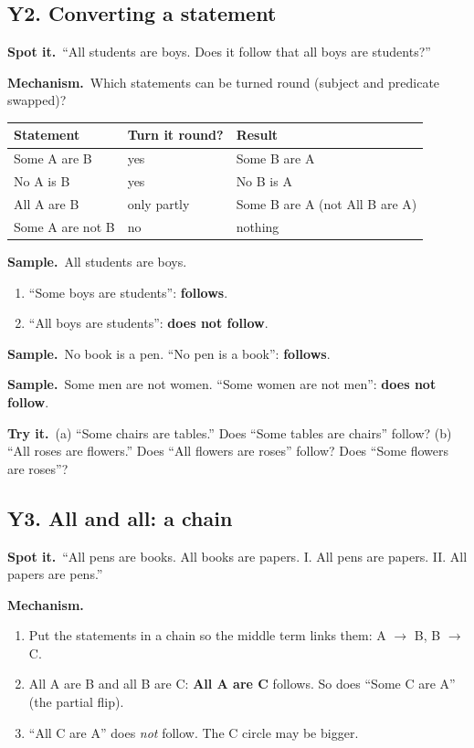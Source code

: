 \documentclass[11pt,a4paper]{article}
\let\oldsubsection\subsection
\renewcommand{\subsection}{\needspace{9\baselineskip}\oldsubsection}
\newcommand{\spot}{\textbf{\color{ember}Spot it.}\ }
\newcommand{\mech}{\textbf{\color{ember}Mechanism.}\ }
\newif\ifkeepsamp
\newcommand{\samp}{\ifkeepsamp\needspace{4\baselineskip}\fi\textbf{\color{ember}Sample.}\ }
\newcommand{\tryit}[1]{\textbf{\color{ember}Try it.}\ #1}
\begin{document}
\subsection{Y2. Converting a statement}
\spot ``All students are boys. Does it follow that all boys are students?''

\mech Which statements can be turned round (subject and predicate swapped)?
\begin{center}\small\renewcommand{\arraystretch}{1.18}\setlength{\tabcolsep}{9pt}
\begin{tabular}{@{}lll@{}}
\toprule
\textbf{\color{slate}Statement} & \textbf{\color{slate}Turn it round?} & \textbf{\color{slate}Result} \\ \midrule
Some A are B & yes & Some B are A \\
No A is B & yes & No B is A \\
All A are B & only partly & Some B are A (not All B are A) \\
Some A are not B & no & nothing \\
\bottomrule
\end{tabular}\end{center}

\samp All students are boys.
\begin{enumerate}
\item ``Some boys are students'': \textbf{follows}.
\item ``All boys are students'': \textbf{does not follow}.
\end{enumerate}
\samp No book is a pen. ``No pen is a book'': \textbf{follows}.

\samp Some men are not women. ``Some women are not men'': \textbf{does not follow}.

\tryit (a) ``Some chairs are tables.'' Does ``Some tables are chairs'' follow? (b) ``All roses are flowers.'' Does ``All flowers are roses'' follow? Does ``Some flowers are roses''?

\subsection{Y3. All and all: a chain}
\spot ``All pens are books. All books are papers. I. All pens are papers. II. All papers are pens.''

\mech
\begin{enumerate}
\item Put the statements in a chain so the middle term links them: A $\to$ B, B $\to$ C.
\item All A are B and all B are C: \textbf{All A are C} follows. So does ``Some C are A'' (the partial flip).
\item ``All C are A'' does \emph{not} follow. The C circle may be bigger.
\end{enumerate}
\end{document}
